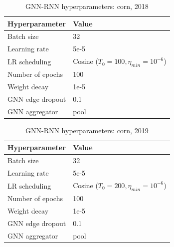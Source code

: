\begin{table}[H]
\centering
\begin{tabular}{|l|l|} \hline
\textbf{Hyperparameter} & \textbf{Value} \\ \hline
Batch size & 32 \\ \hline
Learning rate & 5e-5 \\ \hline
LR scheduling & Cosine ($T_0 = 100, \eta_{min} = 10^{-6}$)  \\ \hline
Number of epochs & 100 \\ \hline
Weight decay & 1e-5 \\ \hline
GNN edge dropout & 0.1 \\ \hline
GNN aggregator & pool \\ \hline
\end{tabular}
\caption{GNN-RNN hyperparameters: corn, 2018}
\label{hyperparams_gnn_corn_2018}
\end{table}

\begin{table}[H]
\centering
\begin{tabular}{|l|l|} \hline
\textbf{Hyperparameter} & \textbf{Value} \\ \hline
Batch size & 32 \\ \hline
Learning rate & 5e-5 \\ \hline
LR scheduling & Cosine ($T_0 = 200, \eta_{min} = 10^{-6}$)  \\ \hline
Number of epochs & 100 \\ \hline
Weight decay & 1e-5 \\ \hline
GNN edge dropout & 0.1 \\ \hline
GNN aggregator & pool \\ \hline
\end{tabular}
\caption{GNN-RNN hyperparameters: corn, 2019}
\label{hyperparams_gnn_corn_2019}
\end{table}


